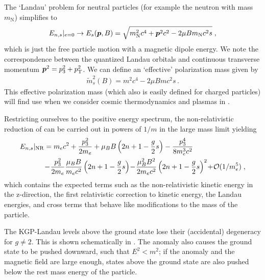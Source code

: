 The `Landau' problem for neutral particles (for example the neutron with mass $m_\mathrm{N}$) simplifies to
\begin{gather}
\label{neutral:1}
E_{n,s}|_{e=0}\rightarrow E_{s}(\boldsymbol{p},B)=\sqrt{m_\mathrm{N}^{2}c^{4}+\boldsymbol{p}^{2}c^{2}-2\mu B m_\mathrm{N}c^{2}s}\;,
\end{gather}
which is just the free particle motion with a magnetic dipole energy. We note the correspondence between the quantized Landau orbitals and continuous transverse momentum $\boldsymbol{p}^{2}=p_{3}^{2}+p_\mathrm{T}^{2}$. We can define an `effective' polarization mass given by
\begin{gather}
\label{neutral:2}
\boxed{\tilde{m}^{2}_{s}(B)=m^{2}c^{4}-2\mu B mc^{2}s}\,.
\end{gather}
This effective polarization mass (which also is easily defined for charged particles) will find use when we consider cosmic thermodynamics and plasmas in .

Restricting ourselves to the positive energy spectrum, the non-relativistic reduction of  can be carried out in powers of $1/m$ in the large mass limit yielding
\begin{alignat}{1}
\label{lan27} E_{n,s}|_\mathrm{NR}&=m_{e}c^{2}+\frac{p_{3}^{2}}{2m_{e}}+\mu_{B}B\left(2n+1-\frac{g}{2}s\right)-\frac{p_{3}^{4}}{8m_{e}^{3}c^{2}}\\ \notag &\!-\!\frac{p_{3}^{2}}{2m_{e}}\frac{\mu_{B}B}{m_{e}c^{2}}\left(2n+1-\frac{g}{2}s\right)\!-\!\frac{\mu_{B}^{2}B^{2}}{2m_{e}c^{2}}\left(2n+1-\frac{g}{2}s\right)^{2}\!+\!\mathcal{O}(1/m_{e}^{5})\;,\end{alignat}
which contains the expected terms such as the non-relativistic kinetic energy in the z-direction, the first relativistic correction to kinetic energy, the Landau energies, and cross terms that behave like modifications to the mass of the particle.

The KGP-Landau levels above the ground state lose their (accidental) degeneracy for $g\neq 2$. This is shown schematically in . The anomaly also causes the ground state to be pushed downward, such that $E^{2}<m^{2}$; if the anomaly and the magnetic field are large enough, states above the ground state are also pushed below the rest mass energy of the particle.


